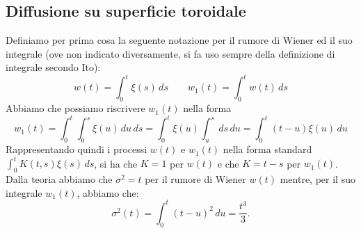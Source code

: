 \documentclass[10pt,a4paper]{article}
\begin{document}
\subsection{Diffusione su superficie toroidale}
\label{sec:diffusione_toro}
Definiamo per prima cosa la seguente notazione per il rumore di Wiener ed il suo integrale (ove non indicato diversamente, si fa uso sempre della definizione di integrale secondo Ito):
\begin{equation}
	w(t) = \int_0^t \xi(s)\,ds \quad\quad w_1(t)=\int_0^t w(t)\,ds
\end{equation}
Abbiamo che possiamo riscrivere \(w_1(t)\) nella forma
\begin{equation}
	w_1(t) = \int_0^t \int_0^s \xi(u)\,du\,ds = \int_0^t \xi(u)\int_u^s\,ds\,du = \int_0^t (t-u)\xi(u)\,du
\end{equation}
Rappresentando quindi i processi \(w(t)\) e \(w_1(t)\) nella forma standard \(\int_0^t K(t,s)\xi(s)\,ds\), si ha che \(K=1\) per \(w(t)\) e che \(K=t-s\) per \(w_1(t)\). Dalla teoria abbiamo che \(\sigma^2 = t\) per il rumore di Wiener \(w(t)\) mentre, per il suo integrale \(w_1(t)\), abbiamo che:
\begin{equation}
	\sigma^2(t) = \int_0^t (t-u)^2\,du = \frac{t^3}{3}.
\end{equation}
\end{document}
